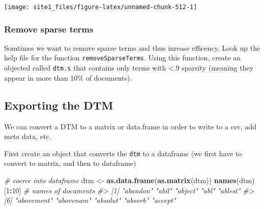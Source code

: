 \documentclass[]{book}
\newenvironment{Shaded}{\begin{snugshade}}{\end{snugshade}}
\newcommand{\CommentTok}[1]{\textcolor[rgb]{0.56,0.35,0.01}{\textit{#1}}}
\newcommand{\DecValTok}[1]{\textcolor[rgb]{0.00,0.00,0.81}{#1}}
\newcommand{\KeywordTok}[1]{\textcolor[rgb]{0.13,0.29,0.53}{\textbf{#1}}}
\newcommand{\NormalTok}[1]{#1}
\newcommand{\OperatorTok}[1]{\textcolor[rgb]{0.81,0.36,0.00}{\textbf{#1}}}
\newcommand{\StringTok}[1]{\textcolor[rgb]{0.31,0.60,0.02}{#1}}
\begin{document}
\begin{center}\texttt{[image: site1\_files/figure-latex/unnamed-chunk-512-1]} \end{center}

\hypertarget{remove-sparse-terms}{%
\subsubsection*{Remove sparse terms}\label{remove-sparse-terms}}

Somtimes we want to remove sparse terms and thus inrease efficency. Look up the help file for the function \texttt{removeSparseTerms}. Using this function, create an objected called \texttt{dtm.s} that contains only terms with \textless{}.9 sparsity (meaning they appear in more than 10\% of documents).

\begin{Shaded}
\end{Shaded}

\hypertarget{exporting-the-dtm}{%
\subsection{Exporting the DTM}\label{exporting-the-dtm}}

We can convert a DTM to a matrix or data.frame in order to write to a csv, add meta data, etc.

First create an object that converts the \texttt{dtm} to a dataframe (we first have to convert to matrix, and then to dataframe)

\begin{Shaded}
\begin{Highlighting}[]
\CommentTok{# coerce into dataframe}
\NormalTok{dtm <-}\StringTok{ }\KeywordTok{as.data.frame}\NormalTok{(}\KeywordTok{as.matrix}\NormalTok{(dtm))}
\KeywordTok{names}\NormalTok{(dtm)[}\DecValTok{1}\OperatorTok{:}\DecValTok{10}\NormalTok{]  }\CommentTok{# names of documents}
\CommentTok{#>  [1] "abandon"   "abil"      "abject"    "abl"       "ablest"   }
\CommentTok{#>  [6] "abovement" "abovenam"  "absolut"   "absorb"    "accept"}
\end{Highlighting}
\end{Shaded}
\end{document}
